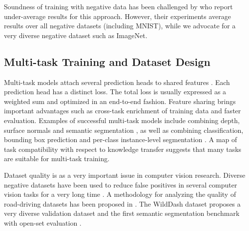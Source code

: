 \documentclass[runningheads]{llncs}
\begin{document}
Soundness of training with negative data
has been challenged by \cite{shafaei2018}
who report under-average results 
for this approach.
However, their experiments average results 
over all negative datasets (including MNIST),
while we advocate for a very diverse  
negative dataset such as ImageNet.



\subsection{Multi-task Training 
  and Dataset Design}

Multi-task models attach 
several prediction heads
to shared features \cite{Caruana1997}.
Each prediction head has a distinct loss.
The total loss is usually expressed 
as a weighted sum \cite{ngiam2011}
and optimized in an end-to-end fashion.
Feature sharing brings important advantages 
such as cross-task enrichment
of training data \cite{bengio13pami}
and faster evaluation.
Examples of successful multi-task models
include combining
depth, surface normals and 
semantic segmentation 
\cite{Eigen2015PredictingDS},
as well as combining
classification, bounding box prediction 
and per-class instance-level segmentation
\cite{mask}.
A map of task compatibility 
with respect to knowledge transfer
\cite{zamir18cvpr}
suggests that many tasks are
suitable for multi-task training.

Dataset quality is  
as a very important issue 
in computer vision research.
Diverse negative datasets 
have been used to reduce false positives
in several computer vision tasks
for a very long time \cite{torralba2011}.
A methodology for analyzing 
the quality of road-driving datasets
has been proposed in \cite{zendel17ijcv}.
The WildDash dataset \cite{zendel18eccv} 
proposes a very diverse validation dataset
and the first semantic segmentation benchmark
with open-set evaluation \cite{scheirer13pami}.
\end{document}
